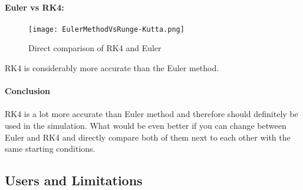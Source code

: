 \documentclass[12pt]{article}
\begin{document}
\paragraph{Euler vs RK4:}
\paragraph{}

\begin{figure}[!htb]
  \centering
  \texttt{[image: EulerMethodVsRunge-Kutta.png]}
  \caption{Direct comparison of RK4 and Euler}\label{Fig:Figure 12}
\end{figure}

RK4 is considerably more accurate than the Euler method.

\paragraph{Conclusion}
\paragraph{}
RK4 is a lot more accurate than Euler method and therefore should definitely be used in the simulation. What would be even better if you can change between Euler and RK4 and directly compare both of them next to each other with the same starting conditions.

\newpage
\subsection{Users and Limitations}
\end{document}
